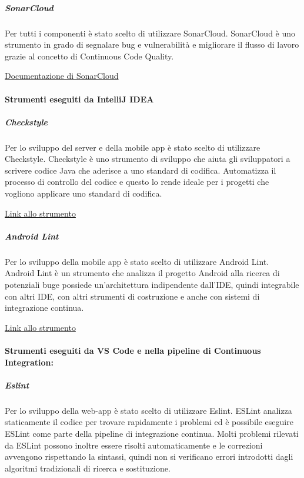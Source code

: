 \documentclass[../../norme-di-progetto.tex]{subfiles}
\begin{document}
\subparagraph{SonarCloud}%
\label{subp:sonarcloud}
Per tutti i componenti è stato scelto di utilizzare SonarCloud.
SonarCloud è uno strumento in grado di segnalare bug e vulnerabilità e migliorare il flusso di lavoro grazie al concetto di Continuous Code Quality.

\href{https://sonarcloud.io/documentation}{Documentazione di SonarCloud}

\paragraph{Strumenti eseguiti da IntelliJ IDEA}%
\label{par:strumenti_eseguiti_da_Intellij_IDEA}

\subparagraph{Checkstyle}%
\label{subp:checkstyle}
Per lo sviluppo del server e della mobile app è stato scelto di utilizzare Checkstyle.
Checkstyle è uno strumento di sviluppo che aiuta gli sviluppatori a scrivere codice Java che aderisce a uno standard di codifica. Automatizza il processo di controllo del codice e questo lo rende ideale per i progetti che vogliono applicare uno standard di codifica.

\href{https://checkstyle.sourceforge.io/}{Link allo strumento}

\subparagraph{Android Lint}%
\label{subp:androidlint}
Per lo sviluppo della mobile app è stato scelto di utilizzare Android Lint.
Android Lint è un strumento che analizza il progetto Android alla ricerca di potenziali buge possiede un'architettura indipendente dall'IDE, quindi integrabile con altri IDE, con altri strumenti di costruzione e anche con sistemi di integrazione continua.

\href{https://developer.android.com/studio/write/lint}{Link allo strumento}

\paragraph{Strumenti eseguiti da VS Code e nella pipeline di Continuous Integration:}%
\label{par:strumenti_eseguiti_da_vscode_e_ci}

\subparagraph{Eslint}%
\label{subp:eslint}
Per lo sviluppo della web-app è stato scelto di utilizzare Eslint.
ESLint analizza staticamente il codice per trovare rapidamente i problemi ed è possibile eseguire ESLint come parte della pipeline di integrazione continua. Molti problemi rilevati da ESLint possono inoltre essere risolti automaticamente e le correzioni avvengono rispettando la sintassi, quindi non si verificano errori introdotti dagli algoritmi tradizionali di ricerca e sostituzione.
\end{document}

